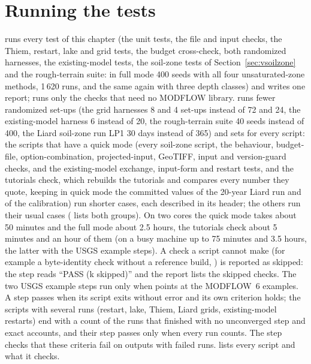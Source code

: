 \section{Running the tests}\label{sec:runtests}
 runs every test of this chapter (the unit tests, the file and input checks, the Thiem,
restart, lake and grid tests, the budget cross-check, both randomized harnesses, the existing-model tests, the soil-zone tests
of Section~\ref{sec:vsoilzone} and the rough-terrain suite: in full mode 400 seeds with all four unsaturated-zone methods,
1\,620 runs, and the same again with three depth classes) and writes one report;  runs only the checks that
need no MODFLOW library.  runs fewer randomized set-ups (the grid harnesses 8 and 4 set-ups instead of
72 and 24, the existing-model harness 6 instead of 20, the rough-terrain suite 40 seeds instead of 400, the Liard soil-zone
run LP1 30 days instead of 365) and sets  for every script: the scripts that have a quick mode
(every soil-zone script, the behaviour, budget-file, option-combination, projected-input, GeoTIFF, input and version-guard checks,
and the existing-model exchange, input-form and restart tests, and the tutorials check, which rebuilds the tutorials and
compares every number they quote, keeping in quick mode the committed values of the 20-year Liard run and of the
calibration) run shorter cases, each described in its header; the others run their usual cases ( lists both groups). On two cores the quick mode takes about 50
minutes and the full mode about 2.5 hours, the tutorials check about 5 minutes and an hour of them (on a busy machine up
to 75 minutes and 3.5 hours, the latter with the USGS example steps). A check a script cannot make (for example a byte-identity check
without a reference build, ) is reported as skipped: the step reads ``PASS (k skipped)'' and the report
lists the skipped checks. The two USGS example steps run only when  points at the MODFLOW~6 examples.
A step passes when its script exits without error and its own criterion holds; the scripts with several runs (restart,
lake, Thiem, Liard grids, existing-model restarts) end with a count of the runs that finished with no unconverged step and
exact accounts, and their step passes only when every run counts. The step  checks that these
criteria fail on outputs with failed runs.  lists every script and what it checks.
